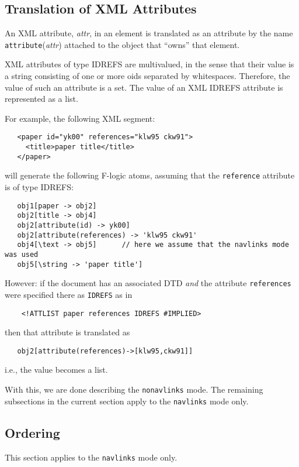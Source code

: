 \subsection{Translation of XML Attributes}

An XML attribute, \emph{attr},  in an element is translated as an attribute
by the name \texttt{attribute}(\emph{attr}) attached to the object that
``owns'' that element.  

XML attributes of type IDREFS are multivalued, in the sense
that their value is a string consisting of one or more oids separated
by whitespaces. Therefore, the value of such an attribute is a set.
The value of an XML IDREFS
attribute is represented as a list.

For example, the following XML segment:
\begin{verbatim}
   <paper id="yk00" references="klw95 ckw91">
     <title>paper title</title>
   </paper>
\end{verbatim}
will generate the following F-logic atoms, assuming that the
{\tt reference}  attribute is of type IDREFS:
\begin{verbatim}
   obj1[paper -> obj2]
   obj2[title -> obj4]
   obj2[attribute(id) -> yk00]
   obj2[attribute(references) -> 'klw95 ckw91'
   obj4[\text -> obj5]      // here we assume that the navlinks mode was used
   obj5[\string -> 'paper title']
\end{verbatim}

However: if the document has an associated DTD \emph{and} the attribute
\texttt{references} were specified there as \texttt{IDREFS} as in
\begin{verbatim}
    <!ATTLIST paper references IDREFS #IMPLIED> 
\end{verbatim}
then that attribute is translated as
\begin{verbatim}
   obj2[attribute(references)->[klw95,ckw91]] 
\end{verbatim}
i.e., the value becomes a list.

With this, we are done describing the \texttt{nonavlinks} mode. The
remaining subsections in the current section apply to the
\texttt{navlinks} mode only.  


\subsection{Ordering}

This section applies to the \texttt{navlinks} mode only. 

